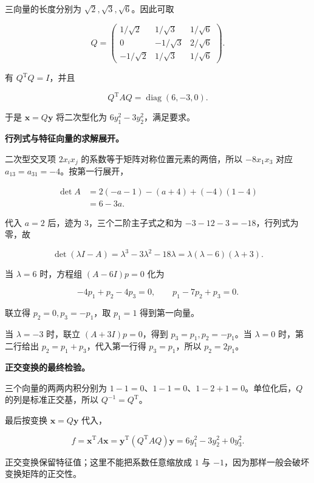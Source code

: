 \documentclass[UTF8,11pt,fontset=windows]{ctexart}
\begin{document}
三向量的长度分别为 $\sqrt2,\sqrt3,\sqrt6$。因此可取

$$
Q=\begin{pmatrix}
1/\sqrt2&1/\sqrt3&1/\sqrt6\\
0&-1/\sqrt3&2/\sqrt6\\
-1/\sqrt2&1/\sqrt3&1/\sqrt6
\end{pmatrix}.
$$

有 $Q^{\mathrm T}Q=I$，并且

$$
Q^{\mathrm T}AQ=\operatorname{diag}(6,-3,0).
$$

于是 $\boldsymbol x=Q\boldsymbol y$ 将二次型化为 $6y_1^2-3y_2^2$，满足要求。

\textbf{行列式与特征向量的求解展开。}

二次型交叉项 $2x_ix_j$ 的系数等于矩阵对称位置元素的两倍，所以 $-8x_1x_3$ 对应 $a_{13}=a_{31}=-4$。按第一行展开，

$$
\begin{aligned}
\det A
&=2(-a-1)-(a+4)+(-4)(1-4)\\
&=6-3a.
\end{aligned}
$$

代入 $a=2$ 后，迹为 $3$，三个二阶主子式之和为 $-3-12-3=-18$，行列式为零，故

$$
\det(\lambda I-A)=\lambda^3-3\lambda^2-18\lambda
=\lambda(\lambda-6)(\lambda+3).
$$

当 $\lambda=6$ 时，方程组 $(A-6I)p=0$ 化为

$$
-4p_1+p_2-4p_3=0,\qquad p_1-7p_2+p_3=0.
$$

联立得 $p_2=0,p_3=-p_1$，取 $p_1=1$ 得到第一向量。

当 $\lambda=-3$ 时，联立 $(A+3I)p=0$，得到 $p_3=p_1,p_2=-p_1$。当 $\lambda=0$ 时，第二行给出 $p_2=p_1+p_3$，代入第一行得 $p_3=p_1$，所以 $p_2=2p_1$。

\textbf{正交变换的最终检验。}

三个向量的两两内积分别为 $1-1=0$、$1-1=0$、$1-2+1=0$。单位化后，$Q$ 的列是标准正交基，所以 $Q^{-1}=Q^{\mathrm T}$。

最后按变换 $\boldsymbol x=Q\boldsymbol y$ 代入，

$$
f=\boldsymbol x^{\mathrm T}A\boldsymbol x
=\boldsymbol y^{\mathrm T}(Q^{\mathrm T}AQ)\boldsymbol y
=6y_1^2-3y_2^2+0y_3^2.
$$

正交变换保留特征值；这里不能把系数任意缩放成 $1$ 与 $-1$，因为那样一般会破坏变换矩阵的正交性。
\end{document}
